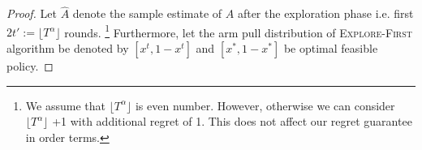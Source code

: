 \begin{proof}
\iffalse 
\begin{theorem}
The EXPLORE-FIRST algorithm achieves the expected social welfare regret of $O\left(\frac{n}{(a/\sigma)}T^{2/3}\sqrt{\log(T)}\right)$.
\end{theorem}
\begin{proof}
\begin{align*}
    \mathcal{R}_{sw} &= \sum_{t=1}^T(x^*-x^t)\Delta\\
    &\leq n\left(2t' + (T-2t')\left[\left(1-2e^{-\left(\frac{ a^2}{\sigma^2}\right)2t'\delta^2/2}\right)\frac{2\delta c}{(1+\delta)(1-c)} + 2e^{-\left(\frac{ a^2}{\sigma^2}\right)2t'\delta^2/2} \right]\right)\\
    &\textup{Choose }2t'=T^{2/3} \textup{ and }\delta = \left(\frac{\sigma}{ a}\right)\sqrt{\frac{2\log{T}}{3T^{2/3}}} \textup{ with }T \textup{ large enough such that }\delta\in(0, 1).\\
    &\leq n\left( T^{2/3} + T\frac{2c\sqrt{\log{(T)}}}{(1-c)\left(a/\sigma\right)T^{1/3} } + 2T^{2/3}\right)\\
    &=nT^{2/3}\left(3+\frac{2\sqrt{2\log(T)}}{(a/\sigma)} \right)  \ (\because c\leq 1/2).
\end{align*}
    
\end{proof}
\fi 

Let $\widehat A$ denote the sample estimate of $A$ after the exploration phase i.e. first $ 2t' :=\lfloor T^\alpha \rfloor$ rounds. \footnote{We assume that $\lfloor T^\alpha \rfloor$ is even number. However, otherwise we can consider $\lfloor T^\alpha \rfloor$ +1 with additional regret of 1. This does not affect our regret guarantee in order terms.     }  %
Furthermore, let the arm pull distribution of \textsc{Explore-First} algorithm  be denoted by $[x^t, 1-x^t]$ and $[x^*, 1-x^*]$ be  optimal feasible policy. 




\end{proof}

